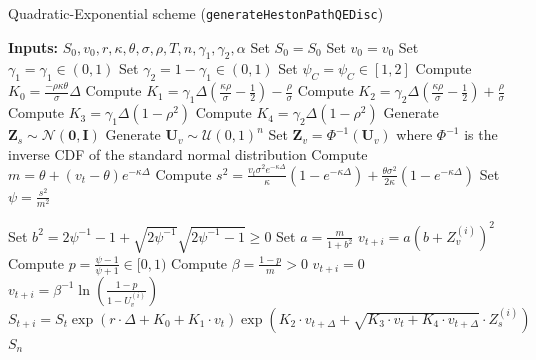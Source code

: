 \documentclass[11pt]{article}
\numberwithin{equation}{section}
\begin{document}
\begin{algorithm}
\caption{Quadratic-Exponential scheme (\texttt{generateHestonPathQEDisc})}
\begin{algorithmic}
\State \textbf{Inputs:} $S_0, v_0, r, \kappa, \theta, \sigma, \rho, T, n,\gamma_1,\gamma_2,\alpha$
\State Set $S_0 = S_0$
\State Set $v_0 = v_0$
\State Set $\gamma_1=\gamma_1\in (0,1)$
\State Set $\gamma_2=1-\gamma_1 \in (0,1)$
\State Set $\psi_C=\psi_C\in [1,2]$ 
\State Compute $K_0 =  \frac{-\rho \kappa \theta}{\sigma} \Delta$
\State Compute $K_1 = \gamma_1 \Delta \left (\frac{\kappa \rho }{\sigma}-\frac{1}{2} \right)-\frac{\rho}{\sigma}$
\State Compute $K_2=\gamma_2\Delta \left ( \frac{\kappa \rho }{\sigma}-\frac{1}{2}\right )+\frac{\rho}{\sigma}$
\State Compute $K_3=\gamma_1\Delta (1-\rho^2)$
\State Compute $K_4=\gamma_2\Delta (1-\rho^2)$
\State Generate $\mathbf{Z}_s \sim \mathcal{N}(\mathbf{0}, \mathbf{I})$
\State Generate $\mathbf{U}_v \sim \mathcal{U}(0, 1)^n$
\State Set $\mathbf{Z}_v = \Phi^{-1}(\mathbf{U}_v)$ where $\Phi^{-1}$ is the inverse CDF of the standard normal distribution
\State Compute $m = \theta + (v_t - \theta)e^{-\kappa \Delta} $
\State Compute $s^2 = \frac{v_t\sigma^2 e^{-\kappa \Delta}}{\kappa}\left (1-e^{-\kappa \Delta}\right)+\frac{\theta \sigma ^2}{2\kappa}\left(1-e^{-\kappa \Delta}\right)$
\State Set $\psi = \frac{s^2}{m^2}$

\State Set $b^2=2\psi^{-1}-1+\sqrt{2\psi^{-1}}\sqrt{2\psi^{-1}-1}\geq 0$
\State Set $a=\frac{m}{1+b^2}$
\vspace{0.1cm}
\State $v_{t+i}=a\left(b+ Z_v^{(i)} \right )^2$
\Else
\State Compute $p=\frac{\psi-1}{\psi+1}\in [0,1)$
\State Compute $\beta=\frac{1-p}{m}>0$
\State $v_{t+i}=0$
\Else
\State $v_{t+i}=\beta^{-1}\ln\left ( \frac{1-p}{1-U_v^{(i)}}\right )$
\EndIf
\EndIf
\State $S_{t+i}=S_t \exp\left(r \cdot \Delta + K_0 + K_1 \cdot v_t  \right) \exp\left(K_2 \cdot v_{t+\Delta}+\sqrt{K_3 \cdot v_t + K_4 \cdot v_{t+\Delta}} \cdot Z_s^{(i)}\right)$
\EndFor
\State \Return $S_n$
\end{algorithmic}
\end{algorithm}

\newpage



\end{document}
